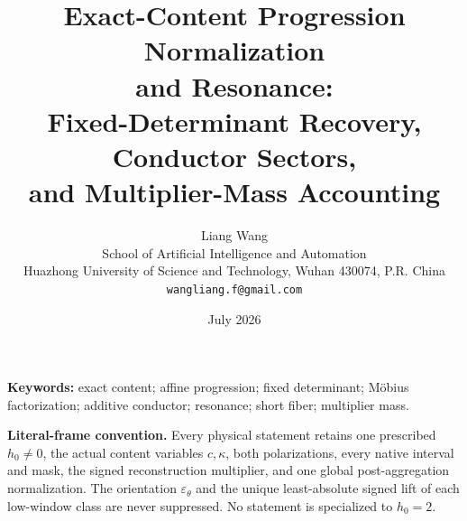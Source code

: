 \documentclass[11pt]{article}
\title{\textbf{Exact-Content Progression Normalization}\\
\textbf{and Resonance:}\\
Fixed-Determinant Recovery, Conductor Sectors,\\
and Multiplier-Mass Accounting}
\author{Liang Wang\\
School of Artificial Intelligence and Automation\\
Huazhong University of Science and Technology, Wuhan 430074, P.R. China\\
\texttt{wangliang.f@gmail.com}}
\date{July 2026}
\theoremstyle{definition}
\theoremstyle{remark}
\begin{document}
\maketitle



\noindent\textbf{Keywords:}
exact content; affine progression; fixed determinant; M\"obius
factorization; additive conductor; resonance; short fiber;
multiplier mass.

\medskip
\noindent\textbf{Literal-frame convention.}
Every physical statement retains one prescribed \(h_0\ne0\), the
actual content variables \(c,\kappa\), both polarizations, every
native interval and mask, the signed reconstruction multiplier, and
one global post-aggregation normalization.  The orientation
\(\varepsilon_\theta\) and the unique least-absolute signed lift of
each low-window class are never suppressed.  No statement is
specialized to \(h_0=2\).









\begingroup
\footnotesize
\raggedright


\endgroup
\end{document}
